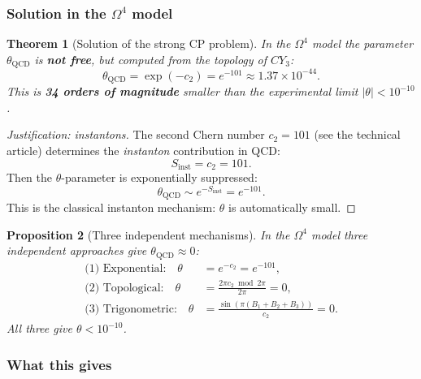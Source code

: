 \documentclass[11pt,a4paper]{article}
\newcommand{\CY}{CY_3}
\newcommand{\Om}{\Omega^4}
\newtheorem{theorem}{Theorem}[section]
\newtheorem{proposition}[theorem]{Proposition}
\theoremstyle{definition}
\begin{document}
\subsubsection{Solution in the \texorpdfstring{$\Om$}{Omega^4} model}

\begin{theorem}[Solution of the strong CP problem]
\label{thm:strong-cp-review}
In the $\Om$ model the parameter $\theta_{\text{QCD}}$ is \textbf{not free}, but
\emph{computed} from the topology of $\CY$:
\begin{equation}
    \boxed{
    \theta_{\text{QCD}} = \exp(-c_2) = e^{-101} \approx 1.37 \times 10^{-44}.
    }
    \label{eq:theta-solution-review}
\end{equation}
This is \textbf{34 orders of magnitude} smaller than the experimental limit
$|\theta| < 10^{-10}$.
\end{theorem}

\begin{proof}[Justification: instantons]
The second Chern number $c_2 = 101$ (see the technical article) determines
the \emph{instanton} contribution in QCD:
\begin{equation}
    S_{\text{inst}} = c_2 = 101.
\end{equation}
Then the $\theta$-parameter is exponentially suppressed:
\begin{equation}
    \theta_{\text{QCD}} \sim e^{-S_{\text{inst}}} = e^{-101}.
\end{equation}
This is the classical instanton mechanism: $\theta$ is automatically small.
\end{proof}

\begin{proposition}[Three independent mechanisms]
\label{prop:three-mechanisms-review}
In the $\Om$ model three independent approaches give $\theta_{\text{QCD}} \approx 0$:
\begin{align}
    \text{(1) Exponential:} \quad
    \theta &= e^{-c_2} = e^{-101}, \\[0.3em]
    \text{(2) Topological:} \quad
    \theta &= \frac{2\pi c_2 \bmod 2\pi}{2\pi} = 0, \\[0.3em]
    \text{(3) Trigonometric:} \quad
    \theta &= \frac{\sin(\pi (B_1 + B_2 + B_3))}{c_2} = 0.
\end{align}
All three give $\theta < 10^{-10}$.
\end{proposition}

\subsubsection{What this gives}
\end{document}
